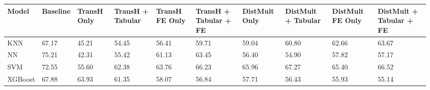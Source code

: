 \begin{tabular}{llllllllll}
\toprule
Model & Baseline & TransH Only & TransH + Tabular & TransH FE Only & TransH + Tabular + FE & DistMult Only & DistMult + Tabular & DistMult FE Only & DistMult + Tabular + FE \\
\midrule
KNN & 67.17 & 45.21 & 54.45 & 56.41 & 59.71 & 59.04 & 60.80 & 62.66 & 63.67 \\
NN & 75.21 & 42.31 & 55.42 & 61.13 & 63.45 & 56.40 & 54.90 & 57.82 & 57.17 \\
SVM & 72.55 & 55.60 & 62.38 & 63.76 & 66.23 & 65.96 & 67.27 & 65.40 & 66.52 \\
XGBoost & 67.88 & 63.93 & 61.35 & 58.07 & 56.84 & 57.71 & 56.43 & 55.93 & 55.14 \\
\bottomrule
\end{tabular}
